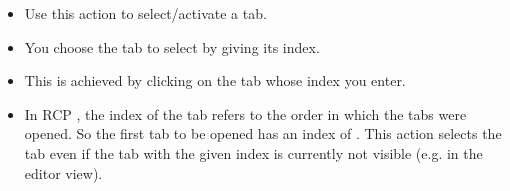 \begin{itemize}
\item Use this action to select/activate a tab.
\item You choose the tab to select by giving its index.
\item This is achieved by clicking on the tab whose index you enter.
\item In RCP \gdauts{}, the index of the tab refers to the order in which the tabs were opened. So the first tab to be opened has an index of . This action selects the tab  even if the tab with the given index is currently not visible (e.g. in the editor view). 
\end{itemize}
 

